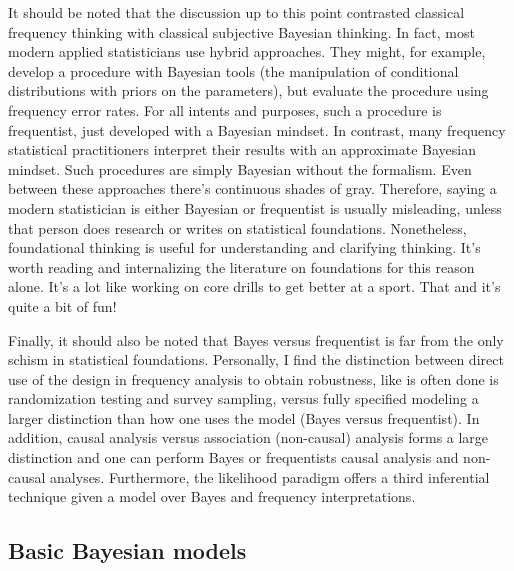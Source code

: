 It should be noted that the discussion up to this point contrasted classical
frequency thinking with classical subjective Bayesian thinking. In fact, most modern
applied statisticians use hybrid approaches. They might, for example, develop a
procedure with Bayesian tools (the manipulation of conditional distributions with 
priors on the parameters), but evaluate the procedure using frequency error rates. 
For all intents and purposes, such a procedure is frequentist, just developed
with a Bayesian mindset. In contrast, many frequency statistical practitioners 
interpret their results with an approximate Bayesian mindset. Such procedures
are simply Bayesian without the formalism. Even between these approaches there's
continuous shades of gray. Therefore, saying a modern
statistician is either Bayesian or frequentist is usually misleading, unless
that person does research or writes on statistical foundations. Nonetheless, foundational
thinking is useful for understanding and clarifying thinking. It's worth 
reading and internalizing the literature on foundations for this reason alone. It's a lot like
working on core drills to get better at a sport. That and it's quite a bit of fun! 


Finally, it should also be noted that Bayes versus frequentist is far from the only
schism in statistical foundations. Personally, I find the distinction between direct
use of the design in frequency analysis to obtain robustness, like is often done is randomization testing and survey sampling,  versus fully specified 
modeling a larger distinction than
how one uses the model (Bayes versus frequentist). In addition, causal analysis
versus association (non-causal) analysis forms a large distinction and one can perform Bayes or
frequentists causal analysis and non-causal analyses. Furthermore, the likelihood
paradigm offers a third inferential 
technique given a model over Bayes and frequency interpretations.


\subsection{Basic Bayesian models}

